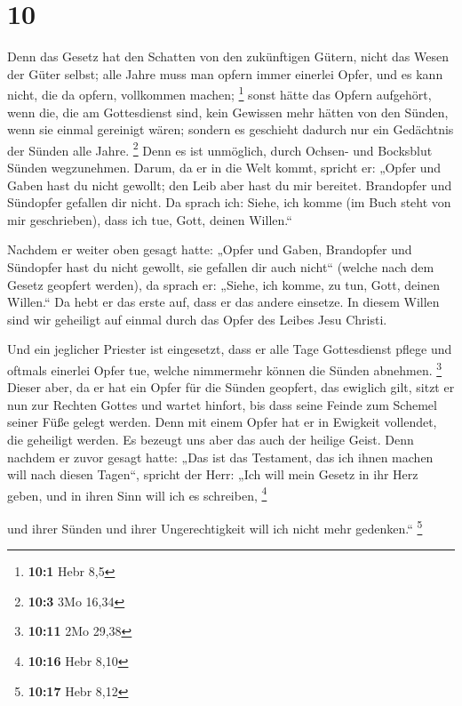 \hypertarget{section-4}{%
\section{10}\label{section-4}}

 Denn das Gesetz hat den Schatten von den zukünftigen
Gütern, nicht das Wesen der Güter selbst; alle Jahre muss man opfern
immer einerlei Opfer, und es kann nicht, die da opfern, vollkommen
machen; \footnote{\textbf{10:1} Hebr 8,5}  sonst hätte das
Opfern aufgehört, wenn die, die am Gottesdienst sind, kein Gewissen mehr
hätten von den Sünden, wenn sie einmal gereinigt wären; 
sondern es geschieht dadurch nur ein Gedächtnis der Sünden alle Jahre.
\footnote{\textbf{10:3} 3Mo 16,34}  Denn es ist unmöglich,
durch Ochsen- und Bocksblut Sünden wegzunehmen.  Darum, da
er in die Welt kommt, spricht er: „Opfer und Gaben hast du nicht
gewollt; den Leib aber hast du mir bereitet.  Brandopfer und
Sündopfer gefallen dir nicht.  Da sprach ich: Siehe, ich
komme (im Buch steht von mir geschrieben), dass ich tue, Gott, deinen
Willen.``

 Nachdem er weiter oben gesagt hatte: „Opfer und Gaben,
Brandopfer und Sündopfer hast du nicht gewollt, sie gefallen dir auch
nicht`` (welche nach dem Gesetz geopfert werden),  da sprach
er: „Siehe, ich komme, zu tun, Gott, deinen Willen.`` Da hebt er das
erste auf, dass er das andere einsetze.  In diesem Willen
sind wir geheiligt auf einmal durch das Opfer des Leibes Jesu Christi.

 Und ein jeglicher Priester ist eingesetzt, dass er alle
Tage Gottesdienst pflege und oftmals einerlei Opfer tue, welche
nimmermehr können die Sünden abnehmen. \footnote{\textbf{10:11} 2Mo
  29,38}  Dieser aber, da er hat ein Opfer für die Sünden
geopfert, das ewiglich gilt, sitzt er nun zur Rechten Gottes
 und wartet hinfort, bis dass seine Feinde zum Schemel
seiner Füße gelegt werden.  Denn mit einem Opfer hat er in
Ewigkeit vollendet, die geheiligt werden.  Es bezeugt uns
aber das auch der heilige Geist. Denn nachdem er zuvor gesagt hatte:
 „Das ist das Testament, das ich ihnen machen will nach
diesen Tagen``, spricht der Herr: „Ich will mein Gesetz in ihr Herz
geben, und in ihren Sinn will ich es schreiben, \footnote{\textbf{10:16}
  Hebr 8,10}

 und ihrer Sünden und ihrer Ungerechtigkeit will ich nicht
mehr gedenken.`` \footnote{\textbf{10:17} Hebr 8,12}

